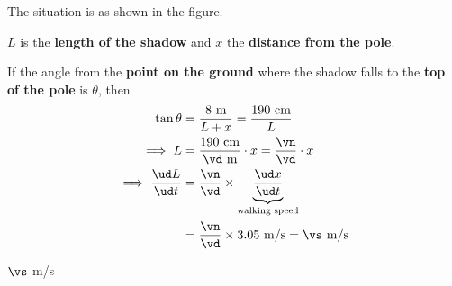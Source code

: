 \begin{solution}[\halfpage]
  The situation is as shown in the figure. 
  
  $L$ is the \textbf{length of the shadow} and 
  $x$ the \textbf{distance from the pole}. 

  If the angle from the \textbf{point on the ground} where the shadow falls to 
  the \textbf{top of the pole} is $\theta$, then 
  \begin{align}
      \tan\theta &= \dfrac{\vp\text{ m}}{L+x} = \dfrac{\vm\text{ cm}}{L} \\
      \implies L &= \dfrac{\vm\text{ cm}}{\vd\text{ m}}\cdot x = \dfrac\vn\vd\cdot x \\
      \implies \dfrac{\ud L}{\ud t} &= \dfrac\vn\vd\times\underbrace{\dfrac{\ud x}{\ud t}}_{\text{walking speed}} \\
      &= \dfrac\vn\vd\times \vw\text{ m/s} = \vs\text{ m/s}
  \end{align}
\end{solution}

\ifprintanswers\begin{codex}$\vs$ m/s\end{codex}\fi
